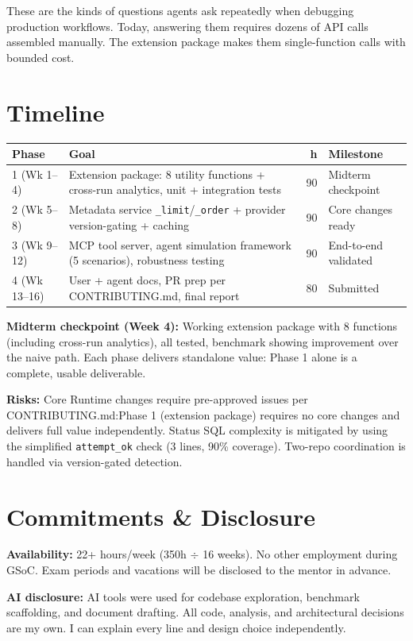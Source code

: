 \documentclass[11pt,a4paper]{article}
\begin{document}
These are the kinds of questions agents ask repeatedly when debugging production workflows. Today, answering them requires dozens of API calls assembled manually. The extension package makes them single-function calls with bounded cost.

\section{Timeline}

\begin{tabularx}{\textwidth}{@{}lXrl@{}}
\toprule
\textbf{Phase} & \textbf{Goal} & \textbf{h} & \textbf{Milestone} \\
\midrule
1 (Wk 1--4)   & Extension package: 8 utility functions + cross-run analytics, unit + integration tests & 90 & Midterm checkpoint \\
2 (Wk 5--8)   & Metadata service \texttt{\_limit}/\texttt{\_order} + provider version-gating + caching & 90 & Core changes ready \\
3 (Wk 9--12)  & MCP tool server, agent simulation framework (5 scenarios), robustness testing & 90 & End-to-end validated \\
4 (Wk 13--16) & User + agent docs, PR prep per CONTRIBUTING.md, final report & 80 & Submitted \\
\bottomrule
\end{tabularx}

\textbf{Midterm checkpoint (Week 4):} Working extension package with 8 functions (including cross-run analytics), all tested, benchmark showing improvement over the naive path. Each phase delivers standalone value: Phase 1 alone is a complete, usable deliverable.

\textbf{Risks:} Core Runtime changes require pre-approved issues per CONTRIBUTING.md:Phase 1 (extension package) requires no core changes and delivers full value independently. Status SQL complexity is mitigated by using the simplified \texttt{attempt\_ok} check (3 lines, 90\% coverage). Two-repo coordination is handled via version-gated detection.


\section{Commitments \& Disclosure}

\textbf{Availability:} 22+ hours/week (350h $\div$ 16 weeks). No other employment during GSoC. Exam periods and vacations will be disclosed to the mentor in advance.

\textbf{AI disclosure:} AI tools were used for codebase exploration, benchmark scaffolding, and document drafting. All code, analysis, and architectural decisions are my own. I can explain every line and design choice independently.
\end{document}
